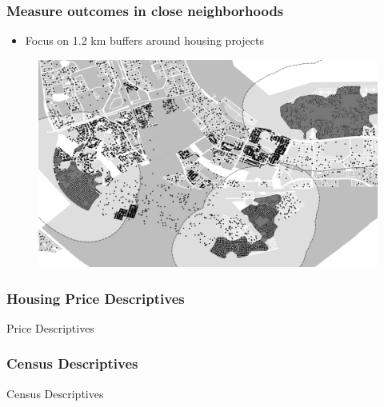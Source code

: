 \documentclass[aspectratio=149]{beamer}
\begin{document}

\begin{frame}
\frametitle{Measure outcomes in close neighborhoods}
\begin{itemize}
  \item Focus on 1.2 km buffers around housing projects
\end{itemize}
\begin{center}
\begin{figure}
\includegraphics[scale=0.30]{design2.png}
\vspace{-3mm}
\end{figure}
\end{center}
\end{frame}


\begin{frame}
\frametitle{Housing Price Descriptives}
\begin{table}
\caption{Price Descriptives}
\centering
\resizebox{.95\textwidth}{!}{  

}
\end{table}
\end{frame}


\begin{frame}
\frametitle{Census Descriptives}

\begin{table}
\caption{Census Descriptives}
\centering
\resizebox{\textwidth}{!}{  

}
\end{table}


\end{frame}
\end{document}
